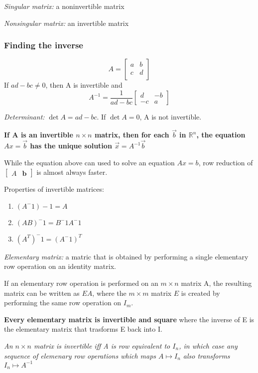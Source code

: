 \documentclass[12pt]{article} %
\newcommand{\R}{\mathbb{R}}
\begin{document}
\emph{Singular matrix:} a noninvertible matrix 

\emph{Nonsingular matrix:} an invertible matrix

\subsubsection{Finding the inverse}
$$A = \begin{bmatrix}
	a & b\\
	c & d\\
\end{bmatrix}$$
If $ad - bc \neq 0$, then A is invertible and 
$$A^{-1} = \frac{1}{ad - bc}\begin{bmatrix}
	d & -b\\
	-c & a
\end{bmatrix}$$

\emph{Determinant:} $\det A = ad - bc$. If $\det A = 0$, A is not invertible. 

\textbf{If A is an invertible $n \times n$ matrix, then for each $\vec{b}$ in $\R^n$, the equation $Ax = \vec{b}$ has the unique solution $\vec{x} = A^{-1}\vec{b}$}

While the equation above can used to solve an equation $Ax = b$, row reduction of $\begin{bmatrix}
	A & \mathbf{b}
\end{bmatrix}$ is almost always faster.

Properties of invertible matrices:
\begin{enumerate}
	\item $(A^-1)-1 = A$
	\item $(AB)^-1 = B^-1A^-1$
	\item $(A^T)^-1 = (A^-1)^T$
\end{enumerate}

\emph{Elementary matrix:} a matric that is obtained by performing a single elementary row operation on an identity matrix.

If an elementary row operation is performed on an $m \times n$ matrix A, the resulting matrix can be written as $EA$, where the $m \times m$ matrix $E$ is created by performing the same row operation on $I_m$.

\textbf{Every elementary matrix is invertible and square} where the inverse of E is the elementary matrix that trasforms E back into I.

\emph{An $n \times n$ matrix is invertible iff A is row equivalent to $I_n$, in which case any sequence of elemenary row operations which maps $A \mapsto I_n$ also transforms $I_n \mapsto A^{-1}$}
\end{document}
